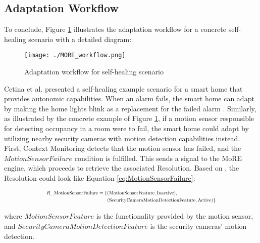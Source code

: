 \documentclass[conference]{IEEEtran}
\begin{document}
\subsection{\textbf{Adaptation Workflow}}
To conclude, Figure \ref{fig:MORE_workflow} illustrates the adaptation workflow for a concrete self-healing scenario with a detailed diagram:

\begin{figure}[H]
	\centering
	\texttt{[image: ./MORE\_workflow.png]}
	\caption{Adaptation workflow for self-healing scenario}
	\label{fig:MORE_workflow}
\end{figure}

Cetina et al. presented a self-healing example scenario for a smart home that provides autonomic capabilities. When an alarm fails, the smart home can adapt by making the home lights blink as a replacement for the failed alarm \cite{MORE_pdf}. Similarly, as illustrated by the concrete example of Figure \ref{fig:MORE_workflow}, if a motion sensor responsible for detecting occupancy in a room were to fail, the smart home could adapt by utilizing nearby security cameras with motion detection capabilities instead.\\

First, Context Monitoring detects that the motion sensor has failed, and the $MotionSensorFailure$ condition is fulfilled. This sends a signal to the MoRE engine, which proceeds to retrieve the associated Resolution. Based on \cite{MORE_pdf}, the Resolution could look like Equation \ref{eq:MotionSensorFailure}:

\begin{equation}
	\scalebox{0.7}{$
			\begin{aligned}
				R\_\text{MotionSensorFailure} = \{ &
				(\text{MotionSensorFeature}, \text{Inactive}),                                                    \\
				                                   & (\text{SecurityCameraMotionDetectionFeature}, \text{Active})
				\}
			\end{aligned}
		$}
	\label{eq:MotionSensorFailure}
\end{equation}

\vspace{1em} %

where $MotionSensorFeature$ is the functionality provided by the motion sensor, and $SecurityCameraMotionDetectionFeature$ is the security cameras' motion detection.\\
\end{document}
